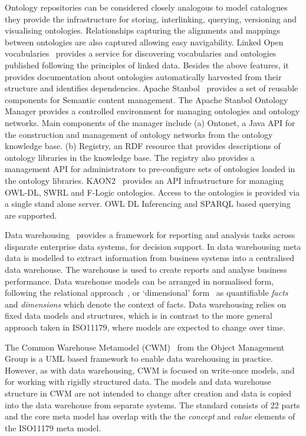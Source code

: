 
Ontology repositories can be considered closely analogous to model
catalogues they provide the infrastructure for storing, interlinking,
querying, versioning and visualising ontologies. Relationships
capturing the alignments and mappings between ontologies are also
captured allowing easy navigability. Linked Open vocabularies~\cite{LOV} provides a service for discovering vocabularies and ontologies published following the principles of
linked data. Besides the above features, it provides documentation
about ontologies automatically harvested from their structure and
identifies dependencies. Apache Stanbol~\cite{Stanbol} provides a set of reusable components for Semantic
content management. The Apache Stanbol Ontology Manager provides a
controlled environment for managing ontologies and ontology
networks. Main components of the manager include (a) Ontonet, a Java
API for the construction and management of ontology networks from the
ontology knowledge base. (b) Registry, an RDF resource that provides
descriptions of ontology libraries in the knowledge base. The registry
also provides a management API for administrators to pre-configure
sets of ontologies loaded in the ontology libraries. KAON2~\cite{Kaon2} provides an API infrastructure for managing OWL-DL, SWRL and F-Logic ontologies. Access to the ontologies is provided via a single stand alone server. OWL DL Inferencing and SPARQL based
querying are supported.




Data warehousing~\cite{kim02} provides a framework for reporting and analysis tasks across disparate enterprise data systems, for decision support. In data warehousing meta data is modelled to extract information from business systems into a centralised data warehouse. The warehouse is used to create reports and analyse business performance. Data warehouse models can be arranged in normalised form, following the relational approach~\cite{inm92}, or `dimensional’ form~\cite{kim02} as quantifiable \emph{facts} and \emph{dimensions} which denote the context of facts. Data warehousing relies on fixed data models and structures, which is in contrast to the more general approach taken in ISO11179, where models are expected to change over time. 

The Common Warehouse Metamodel (CWM)~\cite{poole03} from the Object Management Group is a UML based framework to enable data warehousing in practice. However, as with data warehousing, CWM is focused on write-once models, and for working with rigidly structured data. The models and data warehouse structure in CWM are not intended to change after creation and data is copied into the data warehouse from separate systems. The standard consists of 22 parts and the core meta model has overlap with the the \emph{concept} and \emph{value} elements of the ISO11179 meta model.

